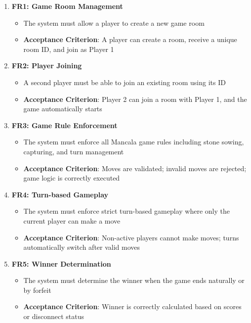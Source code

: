 \documentclass{scrartcl}
\begin{document}
\begin{enumerate}
  \item \textbf{FR1: Game Room Management}
  \begin{itemize}
    \item The system must allow a player to create a new game room
    \item \textbf{Acceptance Criterion}: A player can create a room, receive a unique room ID,
      and join as Player 1
  \end{itemize}

  \item \textbf{FR2: Player Joining}
  \begin{itemize}
    \item A second player must be able to join an existing room using its ID
    \item \textbf{Acceptance Criterion}: Player 2 can join a room with Player 1,
      and the game automatically starts
  \end{itemize}

  \item \textbf{FR3: Game Rule Enforcement}
  \begin{itemize}
    \item The system must enforce all Mancala game rules including stone sowing, capturing,
      and turn management
    \item \textbf{Acceptance Criterion}: Moves are validated; invalid moves are rejected;
      game logic is correctly executed
  \end{itemize}

  \item \textbf{FR4: Turn-based Gameplay}
  \begin{itemize}
    \item The system must enforce strict turn-based gameplay where only the current player
      can make a move
    \item \textbf{Acceptance Criterion}: Non-active players cannot make moves;
      turns automatically switch after valid moves
  \end{itemize}

  \item \textbf{FR5: Winner Determination}
  \begin{itemize}
    \item The system must determine the winner when the game ends naturally or by forfeit
    \item \textbf{Acceptance Criterion}: Winner is correctly calculated based on scores or disconnect status
  \end{itemize}


\end{enumerate}
\end{document}
